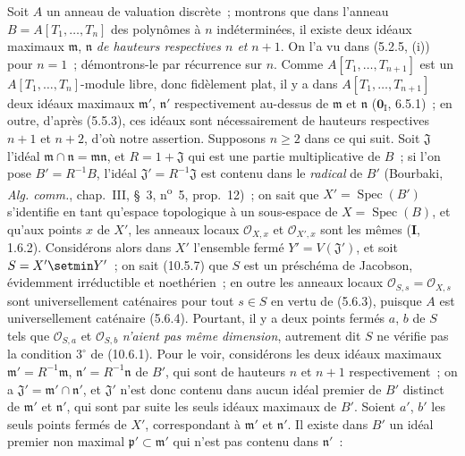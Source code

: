 \begin{env}[10.7.3]
\label{IV.10.7.3-fr}
Soit $A$ un anneau de valuation discrète~; montrons que dans l'anneau
$B=A[T_1,\ldots,T_n]$ des polynômes à $n$ indéterminées, il existe deux idéaux
maximaux $\mathfrak m$, $\mathfrak n$ \emph{de hauteurs respectives $n$ et}
$n+1$. On l'a vu dans (5.2.5, (i)) pour $n=1$~; démontrons-le par récurrence sur
$n$. Comme $A[T_1,\ldots,T_{n+1}]$ est un $A[T_1,\ldots,T_n]$-module libre,
donc fidèlement plat, il y a dans $A[T_1,\ldots,T_{n+1}]$ deux idéaux maximaux
$\mathfrak m'$, $\mathfrak n'$ respectivement au-dessus de $\mathfrak m$ et
$\mathfrak n$ ($\mathbf 0_{\mathrm I}$, 6.5.1)~; en outre, d'après (5.5.3), ces
idéaux sont nécessairement de hauteurs respectives $n+1$ et $n+2$, d'où notre
assertion. Supposons $n\geq2$ dans ce qui suit. Soit
$\mathfrak J$ l'idéal $\mathfrak m\cap\mathfrak n=\mathfrak m\mathfrak n$, et
$R=1+\mathfrak J$ qui est une partie multiplicative de $B$~; si l'on pose
$B'=R^{-1}B$, l'idéal $\mathfrak J'=R^{-1}\mathfrak J$ est contenu dans le
\emph{radical} de $B'$ (Bourbaki, \emph{Alg. comm.}, chap.~III, \S~3,
n\textsuperscript{o}~5, prop.~12)~; on sait que $X'=\operatorname{Spec}(B')$
s'identifie en tant qu'espace topologique à un sous-espace de
$X=\operatorname{Spec}(B)$, et qu'aux points $x$ de $X'$, les anneaux locaux
$\mathcal O_{X,x}$ et $\mathcal O_{X',x}$ sont les mêmes (\textbf{I}, 1.6.2).
Considérons alors dans $X'$ l'ensemble fermé $Y'=V(\mathfrak J')$, et soit
$S=X'\setmin Y'$~; on sait (10.5.7) que $S$ est un préschéma de Jacobson, évidemment
irréductible et noethérien~; en outre les anneaux locaux
$\mathcal O_{S,s}=\mathcal O_{X,s}$ sont universellement caténaires pour tout $s\in S$
en vertu de (5.6.3), puisque $A$ est universellement caténaire (5.6.4). Pourtant,
il y a deux points fermés $a$, $b$ de $S$ tels que $\mathcal O_{S,a}$ et
$\mathcal O_{S,b}$ \emph{n'aient pas même dimension}, autrement dit $S$ ne vérifie
pas la condition $3^\circ$ de (10.6.1). Pour le voir, considérons les deux idéaux
maximaux $\mathfrak m'=R^{-1}\mathfrak m$, $\mathfrak n'=R^{-1}\mathfrak n$ de
$B'$, qui sont de hauteurs $n$ et $n+1$ respectivement~; on a
$\mathfrak J'=\mathfrak m'\cap\mathfrak n'$, et $\mathfrak J'$ n'est donc
contenu dans aucun idéal premier de $B'$ distinct de $\mathfrak m'$ et
$\mathfrak n'$, qui sont par suite les seuls idéaux maximaux de $B'$. Soient
$a'$, $b'$ les seuls points fermés de $X'$, correspondant à $\mathfrak m'$ et
$\mathfrak n'$. Il existe dans $B'$ un idéal premier non maximal
$\mathfrak p'\subset\mathfrak m'$ qui n'est pas contenu dans $\mathfrak n'$~:

\end{env}
